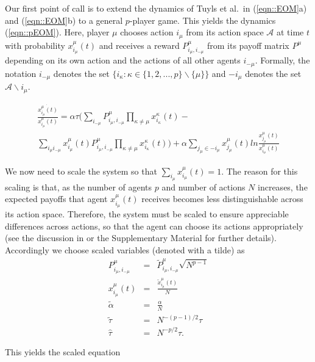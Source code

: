 \documentclass[sigconf]{aamas}
\newcommand{\xmu}[2]{x_{#1_#2}^{#2}(t)}
\newcommand{\payoff}[2]{P^{#2}_{#1_#2, #1_{-#2}}}
\newcommand{\txmu}[2]{\tilde{x}_{#1_#2}^{#2}(t)}
\newcommand{\tpayoff}[2]{\tilde{P}^{#2}_{#1_#2, #1_{-#2}}}
\newcommand{\talpha}{\tilde{\alpha}}
\newcommand{\ttau}{\tilde{\tau}}
\newcommand{\htau}{\hat{\tau}}
\begin{document}
Our first point of call is to extend the dynamics of Tuyls et al.~in  (\ref{eqn::EOM}a) and (\ref{eqn::EOM}b) to a general $p$-player game. This yields the dynamics (\ref{eqn::pEOM}). Here, player $\mu$ chooses action $i_{\mu}$ from its action space $\mathcal{A}$ at time $t$ with probability $\xmu{i}{\mu}$ and receives a reward $\payoff{i}{\mu}$ from its payoff matrix $P^\mu$ depending on its own action and the actions of all other agents $i_{-\mu}$. Formally, the notation $i_{-\mu}$ denotes the set $\{ i_\kappa : \kappa \in \{1, 2, ..., p\} \backslash \{\mu\} \}$ and $-i_{\mu}$ denotes the set $\mathcal{A} \backslash {i_\mu}$.

\begin{equation}
\begin{split}
    \label{eqn::pEOM}
    \frac{\dot{\xmu{i}{\mu}}}{\xmu{i}{\mu}} = \alpha \tau ( \sum_{i_{-\mu}} \payoff{i}{\mu} \prod_{\kappa \neq \mu} \xmu{i}{\kappa} - \\ \sum_{i_\mu i_{-\mu}} \xmu{i}{\mu} \payoff{i}{\mu} \prod_{\kappa \neq \mu} \xmu{i}{\kappa} ) + \alpha \sum_{j_\mu \in -i_\mu} \xmu{j}{\mu} ln \frac{\xmu{j}{\mu}}{\xmu{i}{\mu}}
\end{split}
\end{equation}

We now need to scale the system so that $\sum_{i_\mu} \xmu{i}{\mu} = 1$. The reason for this scaling is that, as the number of agents $p$ and number of actions $N$ increases, the expected payoffs that agent $\xmu{i}{\mu}$ receives becomes less distinguishable across its action space. Therefore, the system must be scaled to ensure appreciable differences across actions, so that the agent can choose its actions appropriately (see the discussion in \cite{Sanders2018} or the Supplementary Material for further details). Accordingly we choose scaled variables (denoted with a tilde) as
%
\begin{eqnarray*}
        \payoff{i}{\mu} & = & \tpayoff{i}{\mu} \sqrt{N^{p-1}}\\
        \xmu{i}{\mu} & = & \frac{\txmu{i}{\mu}}{N} \\
        \talpha & = & \frac{\alpha}{N} \\
        \ttau & = & N^{-(p-1)/2} \tau \\
        \htau & = & N^{-p/2} \tau.
\end{eqnarray*}

This yields the scaled equation
\end{document}
